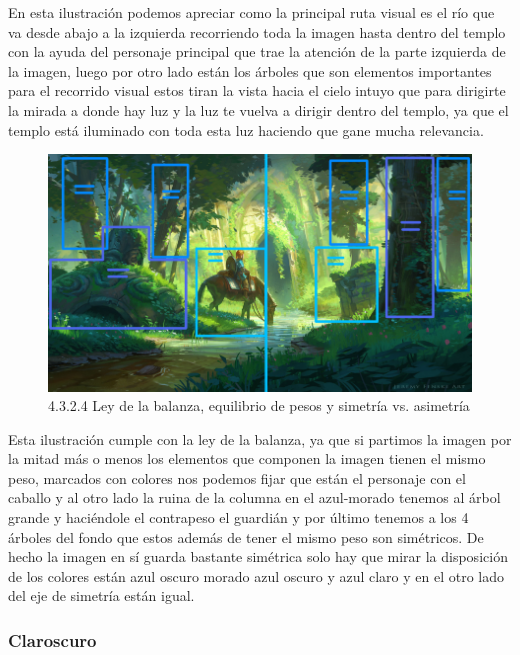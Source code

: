 \documentclass[12pt]{article}
\begin{document}
 En esta ilustración podemos apreciar como la principal ruta visual es el río que va desde abajo a la izquierda recorriendo toda la imagen hasta dentro del templo con la ayuda del personaje principal que trae la atención de la parte izquierda de la imagen, luego por otro lado están los árboles que son elementos importantes para el recorrido visual estos tiran la vista hacia el cielo intuyo que para dirigirte la mirada a donde hay luz y la luz te vuelva a dirigir dentro del templo, ya que el templo está iluminado con toda esta luz haciendo que gane mucha relevancia.

    \begin{figure}[H]
      \centering
      \includegraphics[scale=0.7]{images/Saúl/Sección 3/EA_img3_2Composicion_4LeyBalanza-Simetria.png}
      \caption{\small 4.3.2.4 Ley de la balanza, equilibrio de pesos y simetría vs. asimetría}
    \end{figure}

Esta ilustración cumple con la ley de la balanza, ya que si partimos la imagen por la mitad más o menos los elementos que componen la imagen tienen el mismo peso, marcados con colores nos podemos fijar que están el personaje con el caballo y al otro lado la ruina de la columna en el azul-morado tenemos al árbol grande y haciéndole el contrapeso el guardián y por último tenemos a los 4 árboles del fondo que estos además de tener el mismo peso son simétricos. De hecho la imagen en sí guarda bastante simétrica solo hay que mirar la disposición de los colores están azul oscuro morado azul oscuro y azul claro y en el otro lado del eje de simetría están igual.



        \subsubsection{Claroscuro}
\end{document}
